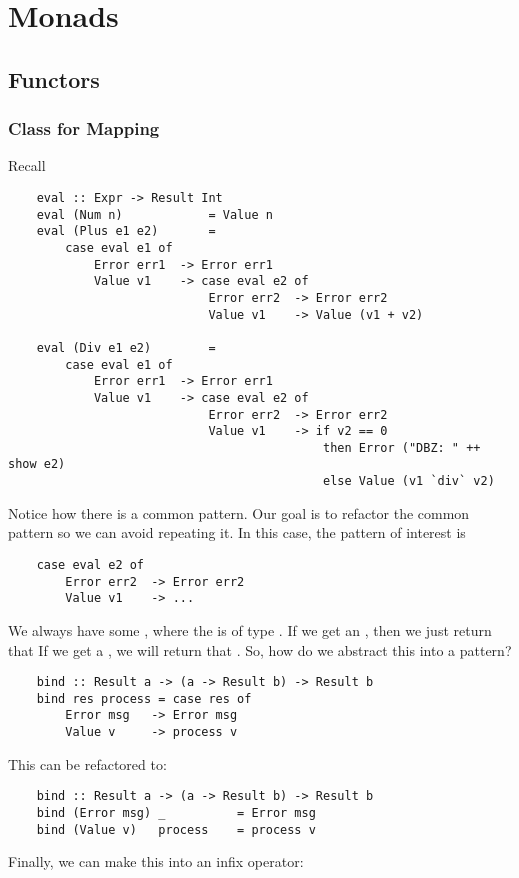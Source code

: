 \documentclass[letterpaper]{article}
\begin{document}
\section{Monads}
\subsection{Functors}
\subsubsection{Class for Mapping}
Recall 
\begin{verbatim}
    eval :: Expr -> Result Int 
    eval (Num n)            = Value n 
    eval (Plus e1 e2)       = 
        case eval e1 of 
            Error err1  -> Error err1 
            Value v1    -> case eval e2 of 
                            Error err2  -> Error err2 
                            Value v1    -> Value (v1 + v2)
    
    eval (Div e1 e2)        = 
        case eval e1 of 
            Error err1  -> Error err1 
            Value v1    -> case eval e2 of 
                            Error err2  -> Error err2 
                            Value v1    -> if v2 == 0 
                                            then Error ("DBZ: " ++ show e2)
                                            else Value (v1 `div` v2)\end{verbatim}
Notice how there is a common pattern. Our goal is to refactor the common pattern so we can avoid repeating it. In this case, the pattern of interest is 
\begin{verbatim}
    case eval e2 of 
        Error err2  -> Error err2 
        Value v1    -> ... \end{verbatim}
We always have some , where the  is of type . If we get an , then we just return that  If we get a , we will return that . So, how do we abstract this into a pattern? 
\begin{verbatim}
    bind :: Result a -> (a -> Result b) -> Result b
    bind res process = case res of 
        Error msg   -> Error msg
        Value v     -> process v\end{verbatim}
This can be refactored to:
\begin{verbatim}
    bind :: Result a -> (a -> Result b) -> Result b 
    bind (Error msg) _          = Error msg 
    bind (Value v)   process    = process v\end{verbatim}
Finally, we can make this into an infix operator: 
\end{document}
